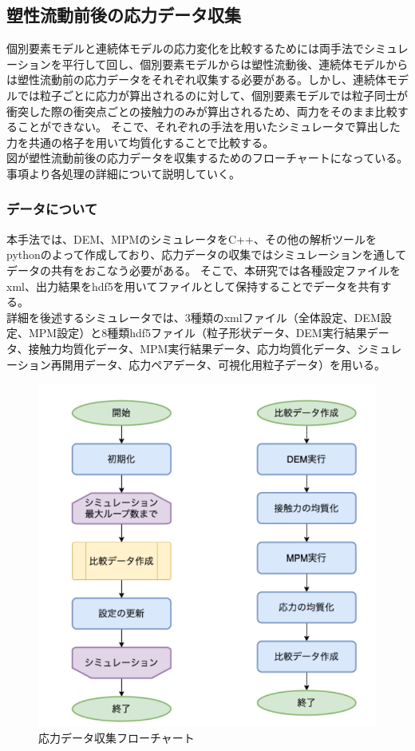 \documentclass[12pt]{ltjsarticle}
\begin{document}
\subsection{塑性流動前後の応力データ収集}
個別要素モデルと連続体モデルの応力変化を比較するためには両手法でシミュレーションを平行して回し、個別要素モデルからは塑性流動後、連続体モデルからは塑性流動前の応力データをそれぞれ収集する必要がある。しかし、連続体モデルでは粒子ごとに応力が算出されるのに対して、個別要素モデルでは粒子同士が衝突した際の衝突点ごとの接触力のみが算出されるため、両力をそのまま比較することができない。
そこで、それぞれの手法を用いたシミュレータで算出した力を共通の格子を用いて均質化することで比較する。\\
図が塑性流動前後の応力データを収集するためのフローチャートになっている。
事項より各処理の詳細について説明していく。

\subsubsection{データについて}
本手法では、DEM、MPMのシミュレータをC++、その他の解析ツールをpythonのよって作成しており、応力データの収集ではシミュレーションを通してデータの共有をおこなう必要がある。
そこで、本研究では各種設定ファイルをxml、出力結果をhdf5を用いてファイルとして保持することでデータを共有する。\\
詳細を後述するシミュレータでは、3種類のxmlファイル（全体設定、DEM設定、MPM設定）と8種類hdf5ファイル（粒子形状データ、DEM実行結果データ、接触力均質化データ、MPM実行結果データ、応力均質化データ、シミュレーション再開用データ、応力ペアデータ、可視化用粒子データ）を用いる。



\begin{figure}[htbp]
  \begin{center}
  \includegraphics*{syusyu_stress_pair.png}
  \end{center}
\caption{応力データ収集フローチャート}
\end{figure}
\end{document}
